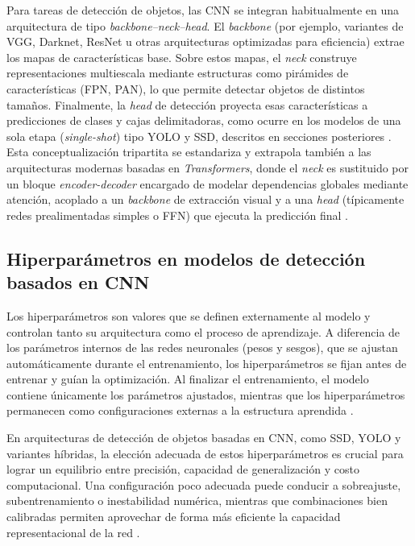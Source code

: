 Para tareas de detección de objetos, las CNN se integran habitualmente en una arquitectura de tipo \textit{backbone--neck--head}. El \textit{backbone} (por ejemplo, variantes de VGG, Darknet, ResNet u otras arquitecturas optimizadas para eficiencia) extrae los mapas de características base. Sobre estos mapas, el \textit{neck} construye representaciones multiescala mediante estructuras como pirámides de características (FPN, PAN), lo que permite detectar objetos de distintos tamaños. Finalmente, la \textit{head} de detección proyecta esas características a predicciones de clases y cajas delimitadoras, como ocurre en los modelos de una sola etapa (\textit{single-shot}) tipo YOLO y SSD, descritos en secciones posteriores \cite{zhang2021one_stage}. Esta conceptualización tripartita se estandariza y extrapola también a las arquitecturas modernas basadas en \textit{Transformers}, donde el \textit{neck} es sustituido por un bloque \textit{encoder-decoder} encargado de modelar dependencias globales mediante atención, acoplado a un \textit{backbone} de extracción visual y a una \textit{head} (típicamente redes prealimentadas simples o FFN) que ejecuta la predicción final \cite{arkin2023survey}.


\subsection{Hiperparámetros en modelos de detección basados en CNN}

\par Los hiperparámetros son valores que se definen externamente al modelo y controlan tanto su arquitectura como el proceso de aprendizaje. A diferencia de los parámetros internos de las redes neuronales (pesos y sesgos), que se ajustan automáticamente durante el entrenamiento, los hiperparámetros se fijan antes de entrenar y guían la optimización. Al finalizar el entrenamiento, el modelo contiene únicamente los parámetros ajustados, mientras que los hiperparámetros permanecen como configuraciones externas a la estructura aprendida \cite{nyuytiymbiy2020parameters}. \\

\par En arquitecturas de detección de objetos basadas en CNN, como SSD, YOLO y variantes híbridas, la elección adecuada de estos hiperparámetros es crucial para lograr un equilibrio entre precisión, capacidad de generalización y costo computacional. Una configuración poco adecuada puede conducir a sobreajuste, subentrenamiento o inestabilidad numérica, mientras que combinaciones bien calibradas permiten aprovechar de forma más eficiente la capacidad representacional de la red \cite{gupta2022deep,zhang2021deep}. \\

